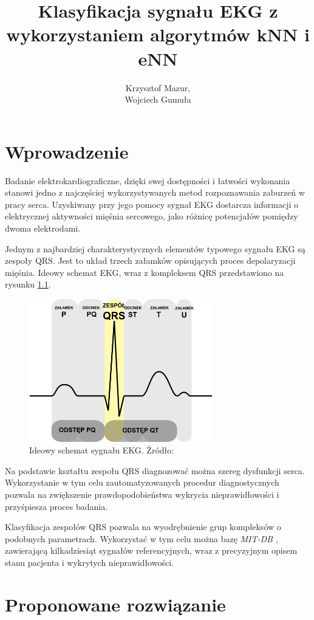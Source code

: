 \documentclass[12pt]{report}
\title{Klasyfikacja sygnału EKG z wykorzystaniem algorytmów kNN i eNN}
\author{Krzysztof Mazur, \\ Wojciech Gumuła}
\begin{document}
\maketitle


\tableofcontents

\chapter{Wprowadzenie}
\large{
Badanie elektrokardiograficzne, dzięki swej dostępności i łatwości wykonania stanowi jedno z najczęściej wykorzystywanych metod rozpoznawania zaburzeń w pracy serca. Uzyskiwany przy jego pomocy sygnał EKG dostarcza informacji o elektrycznej aktywności mięśnia sercowego, jako różnicę potencjałów pomiędzy dwoma elektrodami.

Jednym z najbardziej charakterystycznych elementów typowego sygnału EKG są zespoły QRS. Jest to układ trzech załamków opisujących proces depolaryzacji mięśnia. Ideowy schemat EKG, wraz z kompleksem QRS przedstawiono na rysunku \ref{fig:qrs-complex}.


\begin{figure}[H]
	\centering
	\includegraphics[width=8cm]{img/qrs-complex}
	\caption{Ideowy schemat sygnału EKG. Źródło: \cite{qrs-wiki}}
	\label{fig:qrs-complex}
\end{figure}

Na podstawie kształtu zespołu QRS diagnozować można szereg dysfunkcji serca. Wykorzystanie w tym celu zautomatyzowanych procedur diagnostycznych pozwala na zwiększenie prawdopodobieństwa wykrycia nieprawidłowości i przyśpiesza proces badania.

Klasyfikacja zespołów QRS pozwala na wyodrębnienie grup kompleksów o podobnych parametrach. Wykorzystać w tym celu można bazę \textit{MIT-DB} \cite{mitdb}, zawierającą kilkadziesiąt sygnałów referencyjnych, wraz z precyzyjnym opisem stanu pacjenta i wykrytych nieprawidłowości.
}
\chapter{Proponowane rozwiązanie}
\end{document}
